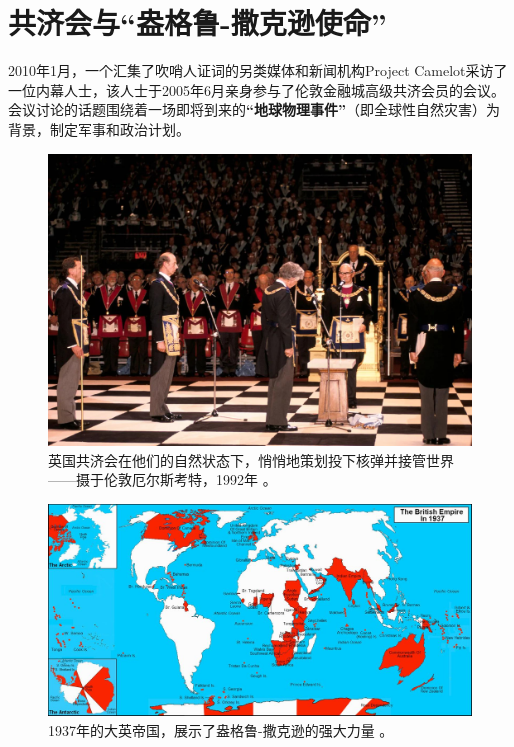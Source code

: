 \documentclass[10pt,twocolumn,letterpaper]{article}
\begin{document}
\section{共济会与“盎格鲁-撒克逊使命”}

2010年1月，一个汇集了吹哨人证词的另类媒体和新闻机构Project Camelot采访了\cite{4,6}一位内幕人士，该人士于2005年6月亲身参与了伦敦金融城高级共济会员的会议。会议讨论的话题围绕着一场即将到来的\textbf{“地球物理事件”}（即全球性自然灾害）为背景，制定军事和政治计划。

\begin{figure}[b]
\begin{center}
   \includegraphics[width=1\linewidth]{freemason.jpg}

\end{center}
   \caption{英国共济会在他们的自然状态下，悄悄地策划投下核弹并接管世界——摄于伦敦厄尔斯考特，1992年 \cite{5}。}
\label{fig:1}
\label{fig:onecol}
\end{figure}

\begin{figure}[t]
\begin{center}
\includegraphics[width=1\textwidth]{british.jpg}
\end{center}
   \caption{1937年的大英帝国，展示了盎格鲁-撒克逊的强大力量 \cite{14}。}
   \label{fig:2}
\end{figure}
\end{document}
